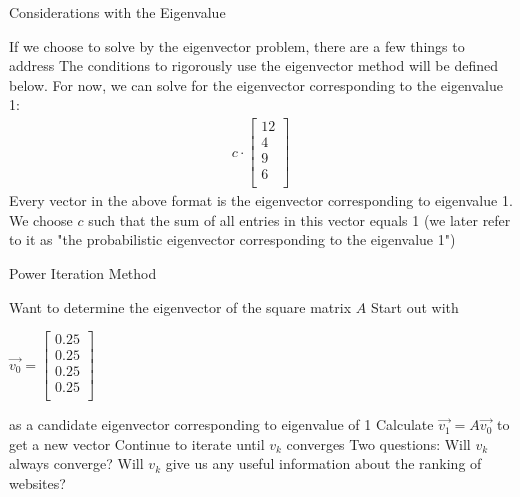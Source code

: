 \documentclass{beamer}
\begin{document}
\begin{frame}[t]{Considerations with the Eigenvalue}
\begin{outline}
    \1 If we choose to solve by the eigenvector problem, there are a few things to address
    \1 The conditions to rigorously use the eigenvector method will be defined below. For now, we can solve for the eigenvector corresponding to the eigenvalue 1:
    \begin{align*}
        c\cdot \begin{bmatrix}
            12\\ 4\\ 9\\ 6\\
        \end{bmatrix}
    \end{align*}
    \1 Every vector in the above format is the eigenvector corresponding to eigenvalue 1. 
    \1 We choose $c$ such that the sum of all entries in this vector equals 1 (we later refer to it as "the probabilistic eigenvector corresponding to the eigenvalue 1")
\end{outline}
\end{frame}

\begin{frame}[t]{Power Iteration Method}
\begin{outline}
    \1 Want to determine the eigenvector of the square matrix $A$
    \1 Start out with 
    \begin{center}
        $\vec{v_0} = \begin{bmatrix}
            0.25 \\ 0.25 \\ 0.25 \\ 0.25 \\
        \end{bmatrix}$
    \end{center}
    as a candidate eigenvector corresponding to eigenvalue of 1
    \1 Calculate $\vec{v_1} = A\vec{v_0}$ to get a new vector
    \1 Continue to iterate until $v_k$ converges 
    \1 Two questions:
        \2 Will $v_k$ always converge?
        \2 Will $v_k$ give us any useful information about the ranking of websites?
\end{outline}
\end{frame}
\end{document}
